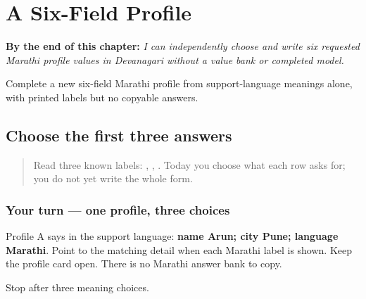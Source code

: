 
\chapter{A Six-Field Profile}
\label{ch:mr-a1-practical-form}

\begin{chapteropening}
\textbf{By the end of this chapter:} \emph{I can independently choose and write six requested Marathi profile values in Devanagari without a value bank or completed model.}

Complete a new six-field Marathi profile from support-language meanings alone, with printed labels but no copyable answers.
\end{chapteropening}

\section[\mr{नाव} · \mr{शहर} · \mr{भाषा}]{Choose the first three answers}

\label{lesson:MR-A1F04-first-three-select}



\begin{quote}
Read three known labels: \textbf{}, \textbf{}, \textbf{}. Today you choose what each row asks for; you do not yet write the whole form.
\end{quote}

\subsection*{Your turn — one profile, three choices}
Profile A says in the support language: \textbf{name Arun; city Pune; language Marathi}. Point to the matching detail when each Marathi label is shown. Keep the profile card open. There is no Marathi answer bank to copy.

\begin{tcolorbox}[breakable,colback=teal!4,colframe=teal!35!black,title={Before you move on}]
Stop after three meaning choices.
\end{tcolorbox}
